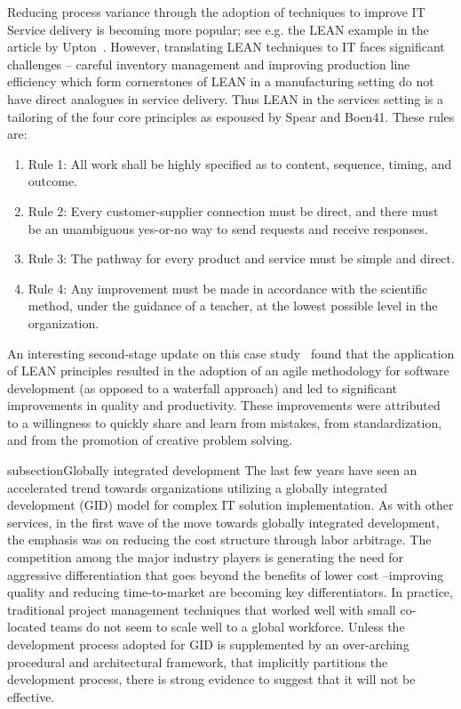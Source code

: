 Reducing process variance through the adoption of techniques to improve IT Service delivery is becoming more popular; see e.g. the LEAN example in the article by Upton~\cite{glo37}. However, translating LEAN techniques to IT faces significant challenges – careful inventory management and improving production line efficiency which form cornerstones of LEAN in a manufacturing setting do not have direct analogues in service delivery. Thus LEAN in the services setting is a tailoring of the four core principles as espoused by Spear and Boen41. These rules are:

\begin{enumerate}
\item{Rule 1: All work shall be highly specified as to content, sequence, timing, and outcome.}
\item{Rule 2: Every customer-supplier connection must be direct, and there must be an unambiguous yes-or-no way to send requests and receive responses.}
\item{Rule 3: The pathway for every product and service must be simple and direct.}
\item{Rule 4: Any improvement must be made in accordance with the scientific method, under the guidance of a teacher, at the lowest possible level in the organization.}
\end{enumerate}

An interesting second-stage update on this case study~\cite{glo38} found that the application of LEAN principles resulted in the adoption of an agile methodology for software development (as opposed to a waterfall approach) and led to significant improvements in quality and productivity. These improvements were attributed to a willingness to quickly share and learn from mistakes, from standardization, and from the promotion of creative problem solving.

subsection{Globally integrated development}
The last few years have seen an accelerated trend towards organizations utilizing a globally integrated development (GID) model for complex IT solution implementation. As with other services, in the first wave of the move towards globally integrated development, the emphasis was on reducing the cost structure through labor arbitrage.  The competition among the major industry players is generating the need for aggressive differentiation that goes beyond the benefits of lower cost –improving quality and reducing time-to-market are becoming key differentiators. In practice, traditional project management techniques that worked well with small co-located teams do not seem to scale well to a global workforce. Unless the development process adopted for GID is supplemented by an over-arching procedural and architectural framework, that implicitly partitions the development process, there is strong evidence to suggest that it will not be effective.

